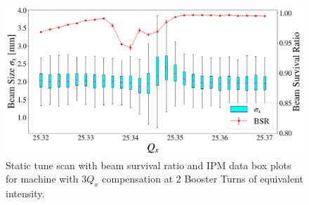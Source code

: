 \begin{figure}[H]
    \centering
    \includegraphics[width=\columnwidth]{chapter4/static2turns_comp_ipm_dampersOFF.png}
    \caption{Static tune scan with beam survival ratio and IPM data box plots for machine with $3Q_x$ compensation at 2 Booster Turns of equivalent intensity.}
    \label{fig:static2_ipm_comp}
\end{figure}